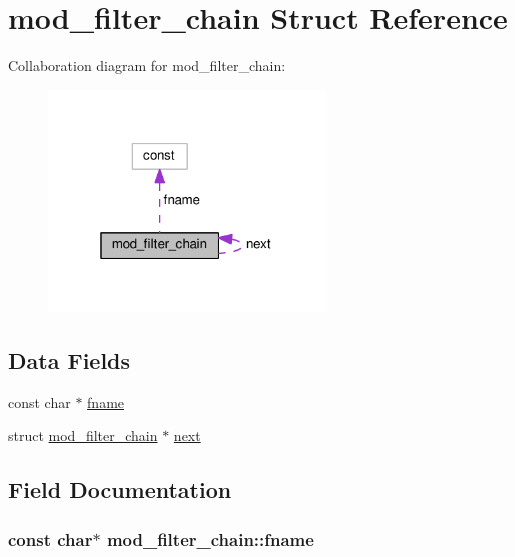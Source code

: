 \hypertarget{structmod__filter__chain}{}\section{mod\+\_\+filter\+\_\+chain Struct Reference}
\label{structmod__filter__chain}


Collaboration diagram for mod\+\_\+filter\+\_\+chain\+:
\nopagebreak
\begin{figure}[H]
\begin{center}
\leavevmode
\includegraphics[width=208pt]{structmod__filter__chain__coll__graph}
\end{center}
\end{figure}
\subsection*{Data Fields}
\begin{DoxyCompactItemize}
\item 
const char $\ast$ \hyperlink{structmod__filter__chain_afeb74ec984f12efc2417e4d840aef8e5}{fname}
\item 
struct \hyperlink{structmod__filter__chain}{mod\+\_\+filter\+\_\+chain} $\ast$ \hyperlink{structmod__filter__chain_a95b66dd76d8ec3e9b5984632d01769d4}{next}
\end{DoxyCompactItemize}


\subsection{Field Documentation}
\subsubsection[{\texorpdfstring{fname}{fname}}]{\setlength{\rightskip}{0pt plus 5cm}const char$\ast$ mod\+\_\+filter\+\_\+chain\+::fname}\hypertarget{structmod__filter__chain_afeb74ec984f12efc2417e4d840aef8e5}{}\label{structmod__filter__chain_afeb74ec984f12efc2417e4d840aef8e5}
